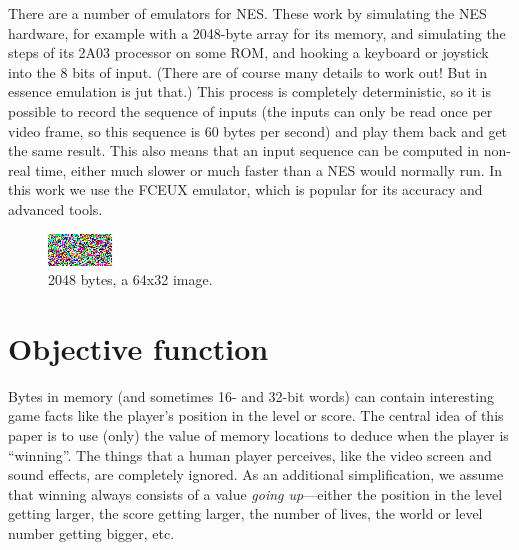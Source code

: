 \documentclass[twocolumn]{article}
\begin{document}

There are a number of emulators for NES. These work by simulating the NES hardware, for example with a 2048-byte array for its memory, and simulating the steps of its 2A03 processor on some ROM, and hooking a keyboard or joystick into the 8 bits of input. (There are of course many details to work out! But in essence emulation is jut that.) This process is completely deterministic, so it is possible to record the sequence of inputs (the inputs can only be read once per video frame, so this sequence is 60 bytes per second) and play them back and get the same result. This also means that an input sequence can be computed in non-real time, either much slower or much faster than a NES would normally run. In this work we use the FCEUX emulator, which is popular for its accuracy and advanced tools.

\begin{figure}[ht]
\begin{center}
\includegraphics[width=0.75 \linewidth]{bytes2048}
\end{center}\vspace{-0.1in}
\caption{2048 bytes, a 64x32 image.}
\label{fig:bytes2048}
\end{figure}

\section{Objective function}

Bytes in memory (and sometimes 16- and 32-bit words) can contain interesting game facts like the player's position in the level or score. The central idea of this paper is to use (only) the value of memory locations to deduce when the player is ``winning''. The things that a human player perceives, like the video screen and sound effects, are completely ignored. As an additional simplification, we assume that winning always consists of a value {\it going up}---either the position in the level getting larger, the score getting larger, the number of lives, the world or level number getting bigger, etc.
\end{document}
